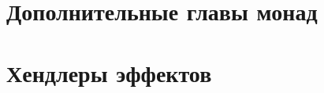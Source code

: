 \documentclass[12pt]{article}
\begin{document}
%
%
%
%
%
%
%
%
%
%


    \section{Дополнительные главы монад}















    \section{Хендлеры эффектов} \label{sec:effect-handlers}
\end{document}

